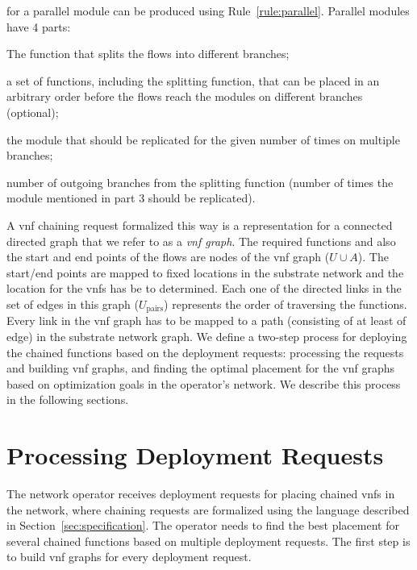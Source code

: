 \documentclass[10pt,a4paper,conference]{IEEEtran}
\begin{document}
for a parallel module can be produced using Rule~\ref{rule:parallel}. Parallel 
modules have 4 parts:
\begin{inparaenum}
 \item The function that splits the flows into different branches; 
 \item a set of functions, including the splitting function, that can be placed 
 in an arbitrary order before the flows reach the modules on different branches 
 (optional);
 \item the module that should be replicated for the given number of times on
 multiple branches;
 \item number of outgoing branches from the splitting function (number of times 
 the module mentioned in part 3 should be replicated).
\end{inparaenum}

A \ac{vnf} chaining request formalized this way is a representation
for a connected directed graph that we refer to as a \emph{\ac{vnf} graph}. The required 
functions and also the start and end points of the flows are nodes of the \ac{vnf} 
graph ($ U {\cup} A $). The start/end points are mapped to fixed locations in the substrate
network and the location for the \acp{vnf} has be to determined. Each one of the 
directed links in the set of edges in this graph ($ U_{\text{pairs}}$) represents 
the order of traversing the functions. Every link in the \ac{vnf} graph has to be 
mapped to a path (consisting of at least of edge) in the 
substrate network graph. We define a two-step process for deploying the chained 
functions based on the deployment requests: processing the requests and building 
\ac{vnf} graphs, and finding the optimal placement for the \ac{vnf} graphs based 
on optimization goals in the operator's network. We describe this process in the following
sections.

\section{Processing Deployment Requests}
\label{sec:transformation}

The network operator receives deployment requests for placing chained \acp{vnf}
in the network, where chaining requests are formalized using the language described in 
Section~\ref{sec:specification}. The operator needs to find the best placement for several
chained functions based on multiple deployment requests. The first step is to build
\ac{vnf} graphs for every deployment request.
\end{document}
